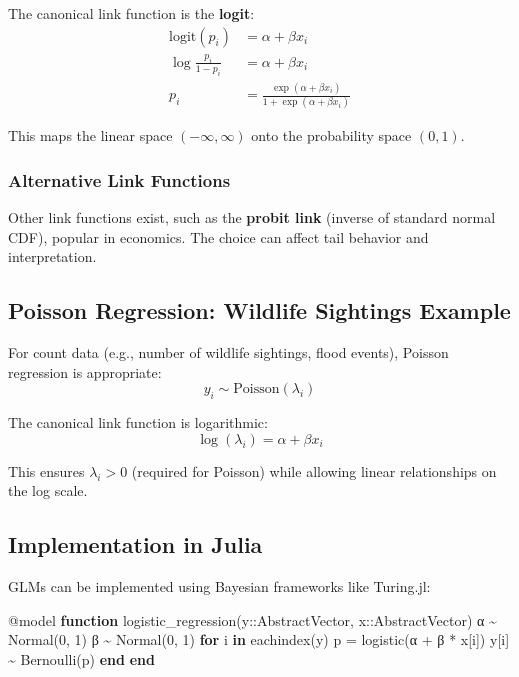 \documentclass[
  letterpaper,
  DIV=11,
  numbers=noendperiod]{scrreprt}
\newenvironment{Shaded}{\begin{snugshade}}{\end{snugshade}}
\newcommand{\ControlFlowTok}[1]{\textcolor[rgb]{0.00,0.23,0.31}{\textbf{#1}}}
\newcommand{\DataTypeTok}[1]{\textcolor[rgb]{0.68,0.00,0.00}{#1}}
\newcommand{\FloatTok}[1]{\textcolor[rgb]{0.68,0.00,0.00}{#1}}
\newcommand{\FunctionTok}[1]{\textcolor[rgb]{0.28,0.35,0.67}{#1}}
\newcommand{\KeywordTok}[1]{\textcolor[rgb]{0.00,0.23,0.31}{\textbf{#1}}}
\newcommand{\NormalTok}[1]{\textcolor[rgb]{0.00,0.23,0.31}{#1}}
\newcommand{\OperatorTok}[1]{\textcolor[rgb]{0.37,0.37,0.37}{#1}}
\newcommand{\PreprocessorTok}[1]{\textcolor[rgb]{0.68,0.00,0.00}{#1}}
\begin{document}
The canonical link function is the \textbf{logit}: \[
\begin{align}
\textrm{logit}(p_i) &= \alpha + \beta x_i \\
\log \frac{p_i}{1 - p_i} &= \alpha + \beta x_i \\
p_i &= \frac{\exp(\alpha + \beta x_i)}{1 + \exp(\alpha + \beta x_i)}
\end{align}
\]

This maps the linear space \((-\infty, \infty)\) onto the probability
space \((0, 1)\).

\subsubsection{Alternative Link
Functions}\label{alternative-link-functions}

Other link functions exist, such as the \textbf{probit link} (inverse of
standard normal CDF), popular in economics. The choice can affect tail
behavior and interpretation.

\subsection{Poisson Regression: Wildlife Sightings
Example}\label{poisson-regression-wildlife-sightings-example}

For count data (e.g., number of wildlife sightings, flood events),
Poisson regression is appropriate: \[
y_i \sim \mathrm{Poisson}(\lambda_i)
\]

The canonical link function is logarithmic: \[
\log(\lambda_i) = \alpha + \beta x_i
\]

This ensures \(\lambda_i > 0\) (required for Poisson) while allowing
linear relationships on the log scale.

\subsection{Implementation in Julia}\label{implementation-in-julia}

GLMs can be implemented using Bayesian frameworks like Turing.jl:

\begin{Shaded}
\begin{Highlighting}[]
\PreprocessorTok{@model} \KeywordTok{function} \FunctionTok{logistic\_regression}\NormalTok{(y}\OperatorTok{::}\DataTypeTok{AbstractVector}\NormalTok{, x}\OperatorTok{::}\DataTypeTok{AbstractVector}\NormalTok{)}
\NormalTok{    α }\OperatorTok{\textasciitilde{}} \FunctionTok{Normal}\NormalTok{(}\FloatTok{0}\NormalTok{, }\FloatTok{1}\NormalTok{)}
\NormalTok{    β }\OperatorTok{\textasciitilde{}} \FunctionTok{Normal}\NormalTok{(}\FloatTok{0}\NormalTok{, }\FloatTok{1}\NormalTok{)}
    \ControlFlowTok{for}\NormalTok{ i }\KeywordTok{in} \FunctionTok{eachindex}\NormalTok{(y)}
\NormalTok{        p }\OperatorTok{=} \FunctionTok{logistic}\NormalTok{(α }\OperatorTok{+}\NormalTok{ β }\OperatorTok{*}\NormalTok{ x[i])}
\NormalTok{        y[i] }\OperatorTok{\textasciitilde{}} \FunctionTok{Bernoulli}\NormalTok{(p)}
    \ControlFlowTok{end}
\KeywordTok{end}
\end{Highlighting}
\end{Shaded}
\end{document}
